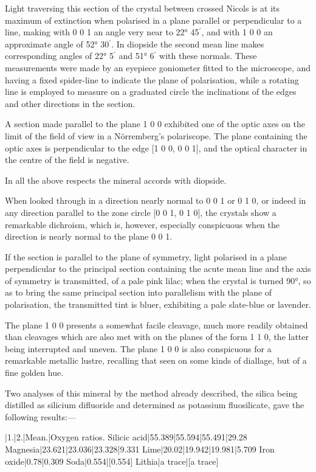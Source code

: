 \documentclass[a4paper, 12pt, oneside]{article}
\begin{document}
Light traversing this section of the crystal between crossed Nicols is at its maximum of extinction when polarised in a plane parallel or perpendicular to a line, making with 0 0 1 an angle very near to 22° 45$^{\prime}$, and with 1 0 0 an approximate angle of 52° 30$^{\prime}$. In diopside the second mean line makes corresponding angles of 22° 5$^{\prime}$ and 51° 6$^{\prime}$ with these normals. These measurements were made by an eyepiece goniometer fitted to the microscope, and having a fixed spider-line to indicate the plane of polarisation, while a rotating line is employed to measure on a graduated circle the inclinations of the edges and other directions in the section.

A section made parallel to the plane 1 0 0 exhibited one of the optic axes on the limit of the field of view in a Nörremberg's polariscope. The plane containing the optic axes is perpendicular to the edge [1 0 0, 0 0 1], and the optical character in the centre of the field is negative.

In all the above respects the mineral accords with diopside.

When looked through in a direction nearly normal to 0 0 1 or 0 1 0, or indeed in any direction parallel to the zone circle [0 0 1, 0 1 0], the crystals show a remarkable dichroism, which is, however, especially conspicuous when the direction is nearly normal to the plane 0 0 1.

If the section is parallel to the plane of symmetry, light polarised in a plane perpendicular to the principal section containing the acute mean line and the axis of symmetry is transmitted, of a pale pink lilac; when the crystal is turned 90°, so as to bring the same principal section into parallelism with the plane of polarisation, the transmitted tint is bluer, exhibiting a pale slate-blue or lavender.

The plane 1 0 0 presents a somewhat facile cleavage, much more readily obtained than cleavages which are also met with on the planes of the form 1 1 0, the latter being interrupted and uneven. The plane 1 0 0 is also conspicuous for a remarkable metallic lustre, recalling that seen on some kinds of diallage, but of a fine golden hue.

Two analyses of this mineral by the method already described, the silica being distilled as silicium difluoride and determined as potassium fluosilicate, gave the following results:---

|1.|2.|Mean.|Oxygen ratios.  
Silicic acid|55.389|55.594|55.491|29.28  
Magnesia|23.621|23.036|23.328|9.331  
Lime|20.02|19.942|19.981|5.709  
Iron oxide|0.78|0.309  
Soda|0.554|[0.554]  
Lithia|a trace|[a trace]
\end{document}

